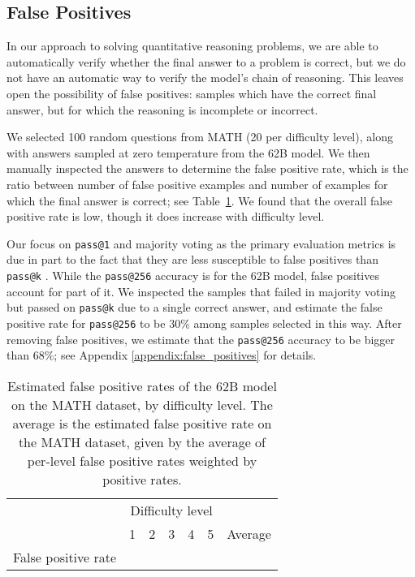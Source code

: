 \documentclass{article}
\makeatletter
\newcommand{\passk}[0]{{\texttt{pass@k} }}
\newcommand{\passone}[0]{{\texttt{pass@1} }}
\makeatother
\begin{document}
\subsection{False Positives}
\label{sec:false_positives}

In our approach to solving quantitative reasoning problems, we are able to automatically verify whether the final answer to a problem is correct, but we do not have an automatic way to verify the model's chain of reasoning. This leaves open the possibility of false positives: samples which have the correct final answer, but for which the reasoning is incomplete or incorrect.

We selected 100 random questions from MATH (20 per difficulty level), along with answers sampled at zero temperature from the 62B model. We then manually inspected the answers to determine the false positive rate, which is the ratio between number of false positive examples and number of examples for which the final answer is correct; see Table~\ref{table:62B_false_positive_rates}. We found that the overall false positive rate is low, though it does increase with difficulty level.

Our focus on \passone and majority voting as the primary evaluation metrics is due in part to the fact that they are less susceptible to false positives than \passk \citep{alphacode}. While the \texttt{pass@256} accuracy is  for the 62B model, false positives account for part of it.
We inspected the samples that failed in majority voting but passed on \texttt{pass@k} due to a single correct answer, and estimate the false positive rate for \texttt{pass@256} to be 30\% among samples selected in this way. After removing false positives, we estimate that the \texttt{pass@256} accuracy to be bigger than 68\%; see Appendix  \ref{appendix:false_positives} for details.

\begin{table}[ht!]  
\caption{\small Estimated false positive rates of the 62B model on the MATH dataset, by difficulty level. The average is the estimated false positive rate on the MATH dataset, given by the average of per-level false positive rates weighted by positive rates.}
\label{table:62B_false_positive_rates}
\begin{center}
\begin{tabular}{ l|ccccc|c } 
\toprule
 & \multicolumn{5}{c|}{Difficulty level} & \\
 & 1 & 2 & 3 & 4 & 5 & Average \\ 
 \midrule
False positive rate &  &  &  &  &  &   \\
\bottomrule
\end{tabular}
\end{center}
\end{table}
\end{document}
